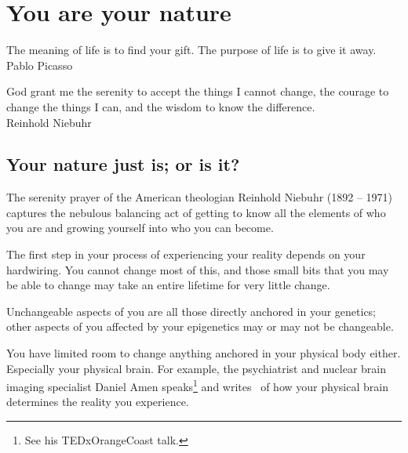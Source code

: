 ﻿\chapter{You are your nature}
\label{chapter:who-am-i-nature}


\begin{chapterquotation}
The meaning of life is to find your gift. The purpose of life is to give it away. \\
\raggedleft\textemdash Pablo Picasso 


\centering
God grant me the serenity to accept the things I cannot change, the courage to change the things I can, and the wisdom to know the difference. \\
\raggedleft\textemdash Reinhold Niebuhr\label{quote:niebuhr}
\end{chapterquotation}


\section{Your nature just is; or is it?}
The serenity prayer of the American theologian Reinhold Niebuhr (1892 – 1971)  captures the nebulous balancing act of getting to know all the elements of who you are and growing yourself into who you can become.


The first step in your process of experiencing your reality depends on your hardwiring. You cannot change most of this, and those small bits that you may be able to change may take an entire lifetime for very little change.


Unchangeable aspects of you are all those directly anchored in your genetics; other aspects of you affected by your epigenetics may or may not be changeable. 


You have limited room to change anything anchored in your physical body either. Especially your physical brain. For example, the psychiatrist and nuclear brain imaging specialist Daniel Amen speaks\footnote{See his TEDxOrangeCoast talk.} and writes~\cite{amen-neuroscience} of how your physical brain determines the reality you experience. 


